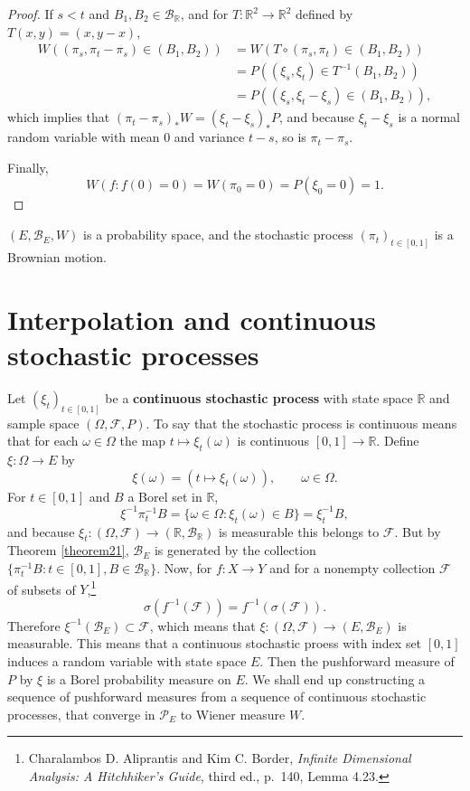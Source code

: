 \documentclass{article}
\theoremstyle{definition}
\begin{document}
\begin{proof}
If $s < t$ and $B_1,B_2 \in \mathscr{B}_{\mathbb{R}}$, and for $T:\mathbb{R}^2 \to \mathbb{R}^2$ defined by
$T(x,y)=(x,y-x)$,
\begin{align*}
W( (\pi_s, \pi_t-\pi_s) \in (B_1,B_2))&=W(T \circ (\pi_s,\pi_t) \in (B_1,B_2))\\
&=P((\xi_s,\xi_t) \in T^{-1}(B_1,B_2))\\
&=P((\xi_s,\xi_t-\xi_s) \in (B_1,B_2)),
\end{align*}
which implies that $(\pi_t-\pi_s)_*W = (\xi_t-\xi_s)_*P$, and because
$\xi_t-\xi_s$ is a normal random variable with mean $0$ and variance $t-s$, so is $\pi_t-\pi_s$. 

Finally, 
\[
W(f : f(0) = 0)=W(\pi_0 = 0)
=P(\xi_0 = 0)=1.
\]
\end{proof}

$(E,\mathscr{B}_E,W)$ is a probability space, and the stochastic process
$(\pi_t)_{t \in [0,1]}$ is a Brownian motion. 





\section{Interpolation and continuous stochastic processes}
Let $(\xi_t)_{t \in [0,1]}$ be a \textbf{continuous stochastic process} with state space $\mathbb{R}$ and sample space
$(\Omega,\mathscr{F},P)$. To say that the stochastic process is continuous means that
for each $\omega \in \Omega$ the map $t \mapsto \xi_t(\omega)$ is continuous $[0,1] \to \mathbb{R}$. 
Define $\xi:\Omega \to E$ by
\[
\xi(\omega) = (t \mapsto \xi_t(\omega)),\qquad \omega \in \Omega.
\]
For $t \in [0,1]$ and $B$ a Borel set in $\mathbb{R}$,
\[
\xi^{-1} \pi_t^{-1} B = \{\omega \in \Omega : \xi_t(\omega) \in B\} = \xi_t^{-1} B,
\]
and because $\xi_t:(\Omega,\mathscr{F}) \to (\mathbb{R},\mathscr{B}_{\mathbb{R}})$ is measurable this belongs to $\mathscr{F}$. 
But by Theorem \ref{theorem21}, $\mathscr{B}_E$ is generated by the collection $\{\pi_t^{-1} B: t \in [0,1], B \in \mathscr{B}_{\mathbb{R}}\}$. 
Now, for $f:X \to Y$ and for a nonempty collection $\mathscr{F}$ of subsets of $Y$,\footnote{Charalambos D. Aliprantis
and Kim C. Border, {\em Infinite Dimensional Analysis: A Hitchhiker's Guide}, third ed., p.~140, Lemma 4.23.}
\[
\sigma(f^{-1}(\mathscr{F})) = f^{-1}(\sigma(\mathscr{F})).
\]
Therefore $\xi^{-1}(\mathscr{B}_E) \subset \mathscr{F}$, which means that
$\xi:(\Omega,\mathscr{F}) \to (E,\mathscr{B}_E)$ is measurable. This means that a continuous stochastic proess with index set $[0,1]$ induces a random variable with state space
$E$.
Then the pushforward measure of $P$ by $\xi$ is a Borel probability measure on $E$. 
We shall end up constructing a sequence of pushforward measures from a sequence of continuous stochastic processes,
that converge in $\mathscr{P}_E$ to Wiener measure $W$. 
\end{document}
